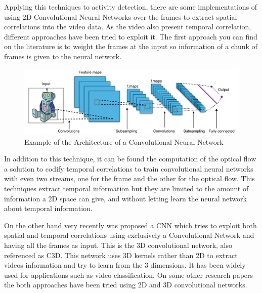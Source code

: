 Applying this techniques to activity detection, there are some implementations of using 2D Convolutional Neural Networks over the frames\cite{gkioxari2015contextual}\cite{yeung2015end}\cite{ballas2015delving} to extract spatial correlations into the video data. As the video also present temporal correlation, different approaches have been tried to exploit it. The first approach you can find on the literature is to weight the frames at the input\cite{yeung2015every} so information of a chunk of frames is given to the neural network. 

\begin{figure}[ht]
\begin{center}
\includegraphics[width=1\linewidth]{img/stateofart/cnn_architecture}
\end{center}
\caption{Example of the Architecture of a Convolutional Neural Network}
\label{fig:cnn_architecture}
\end{figure}

In addition to this technique, it can be found the computation of the optical flow a solution to codify temporal correlations to train convolutional neural networks\cite{simonyan2014two}\cite{Ng_2015_CVPR} with even two streams\cite{wang2015towards}, one for the frame and the other for the optical flow. This techniques extract temporal information but they are limited to the amount of information a 2D space can give, and without letting learn the neural network about temporal information. 


On the other hand very recently was proposed a CNN which tries to exploit both spatial and temporal correlations using exclusively a Convolutional Network and having all the frames as input. This is the 3D convolutional network, also referenced as C3D\cite{tran2014learning}. This network uses 3D kernels rather than 2D to extract videos information and try to learn from the 3 dimensions. It has been widely used\cite{baccouche2011sequential}\cite{tran2015deep}\cite{tran2014learning}\cite{shoutemporal} for applications such as video classification. On some other research papers\cite{yao2015describing}\cite{zhang2016modelling} the both approaches have been tried using 2D and 3D convolutional networks.

